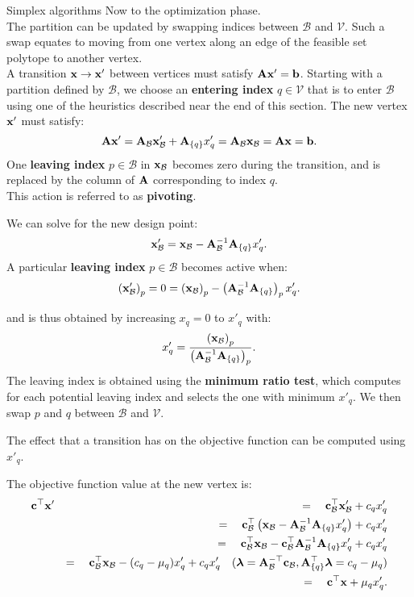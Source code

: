 \documentclass[11pt,compress,t,notes=noshow, xcolor=table]{beamer}
\begin{document}
\begin{vbframe}{Simplex algorithms}
Now to the optimization phase.\\
The partition can be updated by swapping indices between $\mathcal{B}$ and $\mathcal{V}$.
Such a swap equates to moving from one vertex along an edge of the feasible set polytope to another vertex.\\
\lz
A transition $ \mathbf{x} \to \mathbf{x}' $ between vertices must satisfy $ \mathbf{A} \mathbf{x}' = \mathbf{b} $. 
Starting with a partition defined by $ \mathcal{B} $, 
we choose an \textbf{entering index} $ q \in \mathcal{V} $ that is to enter $ \mathcal{B} $ using one of the heuristics described near the end of this section. 
The new vertex $ \mathbf{x}' $ must satisfy:
$$
\mathbf{A} \mathbf{x}' = \mathbf{A}_{\mathcal{B}} \mathbf{x}'_{\mathcal{B}} + \mathbf{A}_{\{q\}} x'_q = \mathbf{A}_{\mathcal{B}} \mathbf{x}_{\mathcal{B}} = \mathbf{A} \mathbf{x} = \mathbf{b}.
$$
\lz
One \textbf{leaving index} $ p \in \mathcal{B} $ in $ \mathbf{x}_{\mathcal{B}} $ becomes zero during the transition, and is replaced by the column of $ \mathbf{A} $ corresponding to index $ q $.\\
This action is referred to as \textbf{pivoting}.

\framebreak

We can solve for the new design point:
$$
\mathbf{x}'_{\mathcal{B}} = \mathbf{x}_{\mathcal{B}} - \mathbf{A}_{\mathcal{B}}^{-1} \mathbf{A}_{\{q\}} x'_q.
$$
\lz
A particular \textbf{leaving index} $ p \in \mathcal{B} $ becomes active when:
$$
\left( \mathbf{x}'_{\mathcal{B}} \right)_p = 0 = \left( \mathbf{x}_{\mathcal{B}} \right)_p - \left( \mathbf{A}_{\mathcal{B}}^{-1} \mathbf{A}_{\{q\}} \right)_p x'_q.
$$

and is thus obtained by increasing $ x_q = 0 $ to $ x'_q $ with:
$$x'_q = \frac{\left( \mathbf{x}_{\mathcal{B}} \right)_p}{\left( \mathbf{A}_{\mathcal{B}}^{-1} \mathbf{A}_{\{q\}} \right)_p}.$$
\lz
The leaving index is obtained using the \textbf{minimum ratio test}, which computes for each potential leaving index and selects the one with minimum $ x'_q $. We then swap $ p $ and $ q $ between $ \mathcal{B} $ and $ \mathcal{V} $.

\framebreak


The effect that a transition has on the objective function can be computed using $x'_q$.\\
\lz

The objective function value at the new vertex is:
\begin{eqnarray*}
    \mathbf{c}^\top \mathbf{x}' &&=\quad \mathbf{c}_{\mathcal{B}}^\top \mathbf{x}'_{\mathcal{B}} + c_q x'_q \\
    &&=\quad \mathbf{c}_{\mathcal{B}}^\top \left( \mathbf{x}_{\mathcal{B}} - \mathbf{A}_{\mathcal{B}}^{-1} \mathbf{A}_{\{q\}} x'_q \right) + c_q x'_q \\
    &&=\quad \mathbf{c}_{\mathcal{B}}^\top \mathbf{x}_{\mathcal{B}} - \mathbf{c}_{\mathcal{B}}^\top \mathbf{A}_{\mathcal{B}}^{-1} \mathbf{A}_{\{q\}} x'_q + c_q x'_q \\
    &&=\quad \mathbf{c}_{\mathcal{B}}^\top \mathbf{x}_{\mathcal{B}} - (c_q - \mu_q) x'_q + c_q x'_q \quad (\bm{\lambda} = \mathbf{A}_{\mathcal{B}}^{-\top} \mathbf{c}_{\mathcal{B}}, \mathbf{A}_{\{q\}}^\top\bm{\lambda}=c_q-\mu_q)\\
    &&=\quad \mathbf{c}^\top \mathbf{x} + \mu_q x'_q.
\end{eqnarray*}


\end{vbframe}
\end{document}
